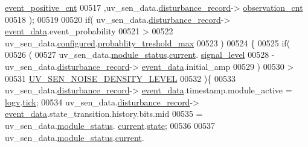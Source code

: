 \begin{DoxyCode}
      \hyperlink{a00028_a7397b9d76d4b57500f27bb23d258a18a}{event\_positive\_cnt}
00517                           ,uv\_sen\_data.\hyperlink{a00035_ac9b38e2c1d3f1013a88d33506c754152}{disturbance\_record}->
      \hyperlink{a00028_ad5b0bac02ce266b91b2b52a1c3ea1d78}{observation\_cnt}
00518                            );
00519 
00520                    \textcolor{keywordflow}{if}( uv\_sen\_data.\hyperlink{a00035_ac9b38e2c1d3f1013a88d33506c754152}{disturbance\_record}->
      \hyperlink{a00028_a8c0bda69e71ef674e60da47ad0be9ab0}{event\_data}.event\_probability
00521                         >
00522                        uv\_sen\_data.\hyperlink{a00035_a94b2d1f6ea4ab334c74d24984dd27843}{configured}.\hyperlink{a00021_a7e2d217b9c9051d361319180a426851c}{probablity\_treshold\_max}
00523                      )
00524                    \{
00525                           \textcolor{keywordflow}{if}(
00526                             (
00527                             uv\_sen\_data.\hyperlink{a00035_a5a53c391562b059eb744ac679f3765ca}{module\_status}.\hyperlink{a00017_ab8af48cdbba92b3ae39c4470e53af944}{current}.
      \hyperlink{a00017_abcdf2bc0c2e5a14863938ae28c3bc96e}{signal\_level}
00528                             - uv\_sen\_data.\hyperlink{a00035_ac9b38e2c1d3f1013a88d33506c754152}{disturbance\_record}->
      \hyperlink{a00028_a8c0bda69e71ef674e60da47ad0be9ab0}{event\_data}.initial\_amp
00529                             )
00530                             >
00531                             \hyperlink{a00020_a6fe600e966b9b8a62c0121805f6cbc0d}{UV\_SEN\_NOISE\_DENSITY\_LEVEL}
00532                           )\{
00533                                  uv\_sen\_data.\hyperlink{a00035_ac9b38e2c1d3f1013a88d33506c754152}{disturbance\_record}->
      \hyperlink{a00028_a8c0bda69e71ef674e60da47ad0be9ab0}{event\_data}.timestamp.module\_active = \hyperlink{a00021_a2e89c46668b39a17753c238950c9e1ec}{logv}.\hyperlink{a00021_a81f0ce68c2c483fb8df726cc1988d8e8}{tick};
00534                                  uv\_sen\_data.\hyperlink{a00035_ac9b38e2c1d3f1013a88d33506c754152}{disturbance\_record}->
      \hyperlink{a00028_a8c0bda69e71ef674e60da47ad0be9ab0}{event\_data}.state\_transition.history.bits.mid
00535                                  = uv\_sen\_data.\hyperlink{a00035_a5a53c391562b059eb744ac679f3765ca}{module\_status}.
      \hyperlink{a00017_ab8af48cdbba92b3ae39c4470e53af944}{current}.\hyperlink{a00017_a6b8d8e916bc56265a3fd279bd26b6d1b}{state};
00536 
00537                                  uv\_sen\_data.\hyperlink{a00035_a5a53c391562b059eb744ac679f3765ca}{module\_status}.\hyperlink{a00017_ab8af48cdbba92b3ae39c4470e53af944}{current}.

\end{DoxyCode}
